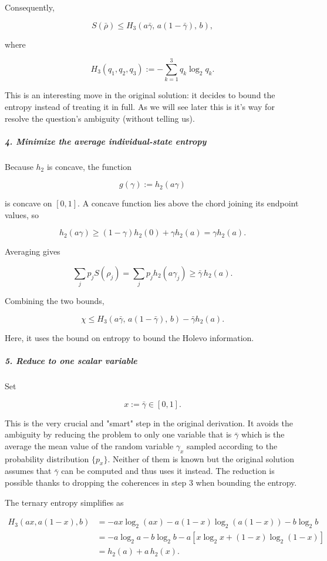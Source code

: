 Consequently,

\[
S(\bar\rho) \leq H_3\!\left( a\bar\gamma,\, a(1-\bar\gamma),\, b \right),
\]

where

\[
H_3(q_1,q_2,q_3):=-\sum_{k=1}^3q_k\log_2q_k.
\]

{
\color{blue}
This is an interesting move in the original solution: it decides to bound the entropy instead of treating it in full. As we will see later this is it's way for resolve the question's ambiguity (without telling us).
}

\subparagraph*{4. Minimize the average individual-state entropy}

Because $h_2$ is concave, the function

\[
g(\gamma):=h_2(a\gamma)
\]

is concave on $[0,1]$. A concave function lies above the chord joining its endpoint values, so

\[
h_2(a\gamma) \geq (1-\gamma)h_2(0)+\gamma h_2(a) = \gamma h_2(a).
\]

Averaging gives

\[
\sum_jp_jS(\rho_j) = \sum_jp_jh_2(a\gamma_j) \geq \bar\gamma\,h_2(a).
\]

Combining the two bounds,

\[
\chi \leq H_3\!\left( a\bar\gamma,\, a(1-\bar\gamma),\, b \right) -\bar\gamma h_2(a).
\]

{
\color{blue}
Here, it uses the bound on entropy to bound the Holevo information.
}


\subparagraph*{5. Reduce to one scalar variable}

Set

\[
x:=\bar\gamma\in[0,1].
\]

{
\color{blue}
This is the very crucial and "smart" step in the original derivation. It avoids the ambiguity by reducing the problem to only one variable that is $\bar\gamma$ which is the average the mean value of the random variable $\gamma_x$ sampled according to the probability distribution $\{p_x\}$. Neither of them is known but the original solution assumes that $\bar\gamma$ can be computed and thus uses it instead. The reduction is possible thanks to dropping the coherences in step 3 when bounding the entropy. 
}


The ternary entropy simplifies as

\[
\begin{aligned}
H_3\left(ax,a(1-x),b\right)
&=-ax\log_2(ax)-a(1-x)\log_2(a(1-x))-b\log_2b\\
&=-a\log_2a-b\log_2b
-a\left[x\log_2x+(1-x)\log_2(1-x)\right]\\
&=h_2(a)+a\,h_2(x).
\end{aligned}
\]


